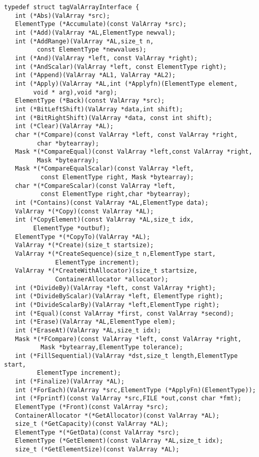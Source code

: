 \begin{verbatim}
typedef struct tagValArrayInterface {
   int (*Abs)(ValArray *src); 
   ElementType (*Accumulate)(const ValArray *src);
   int (*Add)(ValArray *AL,ElementType newval);
   int (*AddRange)(ValArray *AL,size_t n,
         const ElementType *newvalues);
   int (*And)(ValArray *left, const ValArray *right);
   int (*AndScalar)(ValArray *left, const ElementType right);
   int (*Append)(ValArray *AL1, ValArray *AL2);
   int (*Apply)(ValArray *AL,int (*Applyfn)(ElementType element,
        void * arg),void *arg);
   ElementType (*Back)(const ValArray *src);
   int (*BitLeftShift)(ValArray *data,int shift);
   int (*BitRightShift)(ValArray *data, const int shift);
   int (*Clear)(ValArray *AL);
   char *(*Compare)(const ValArray *left, const ValArray *right,
         char *bytearray);
   Mask *(*CompareEqual)(const ValArray *left,const ValArray *right,
         Mask *bytearray);
   Mask *(*CompareEqualScalar)(const ValArray *left,
          const ElementType right, Mask *bytearray);
   char *(*CompareScalar)(const ValArray *left,
          const ElementType right,char *bytearray);
   int (*Contains)(const ValArray *AL,ElementType data);
   ValArray *(*Copy)(const ValArray *AL);
   int (*CopyElement)(const ValArray *AL,size_t idx,
        ElementType *outbuf);
   ElementType *(*CopyTo)(ValArray *AL);
   ValArray *(*Create)(size_t startsize);
   ValArray *(*CreateSequence)(size_t n,ElementType start,
              ElementType increment);
   ValArray *(*CreateWithAllocator)(size_t startsize,
              ContainerAllocator *allocator);
   int (*DivideBy)(ValArray *left, const ValArray *right);
   int (*DivideByScalar)(ValArray *left, ElementType right);
   int (*DivideScalarBy)(ValArray *left,ElementType right);
   int (*Equal)(const ValArray *first, const ValArray *second);
   int (*Erase)(ValArray *AL,ElementType elem);
   int (*EraseAt)(ValArray *AL,size_t idx);
   Mask *(*FCompare)(const ValArray *left, const ValArray *right,
          Mask *bytearray,ElementType tolerance);
   int (*FillSequential)(ValArray *dst,size_t length,ElementType start,
         ElementType increment);
   int (*Finalize)(ValArray *AL);
   int (*ForEach)(ValArray *src,ElementType (*ApplyFn)(ElementType));
   int (*Fprintf)(const ValArray *src,FILE *out,const char *fmt);
   ElementType (*Front)(const ValArray *src);
   ContainerAllocator *(*GetAllocator)(const ValArray *AL);
   size_t (*GetCapacity)(const ValArray *AL);
   ElementType *(*GetData)(const ValArray *src);
   ElementType (*GetElement)(const ValArray *AL,size_t idx);
   size_t (*GetElementSize)(const ValArray *AL);

\end{verbatim}
